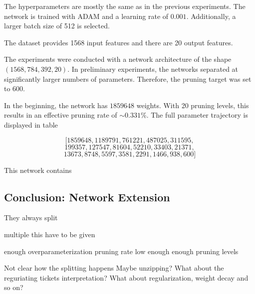 The hyperparameters are mostly the same as in the previous experiments.
The network is trained with ADAM and a learning rate of $0.001$.
Additionally, a larger batch size of 512 is selected.

The dataset provides 1568 input features and there are 20 output features. 

The experiments were conducted with a network architecture of the shape $(1568, 784, 392, 20)$.
In preliminary experiments, the networks separated at significantly larger numbers of parameters.
Therefore, the pruning target was set to 600.





In the beginning, the network has $1859648$ weights.
With 20 pruning levels, this results in an effective pruning rate of $\sim0.331$\%.
The full parameter trajectory is displayed in table

\[
\big[1859648, 1189791, 761221, 487025, 311595, 
\]
\[
199357, 127547, 81604, 52210, 33403,21371,
\]
\[
13673, 8748, 5597, 3581, 2291, 1466, 938, 600\big]    
\]





This network contains

\subsection{Conclusion: Network Extension}
They always split

multiple this have to be given

enough overparameterization
pruning rate low enough
enough pruning levels

Not clear how the splitting happens
Maybe unzipping?
What about the reguriating tickets interpretation?
What about regularization, weight decay and so on?
